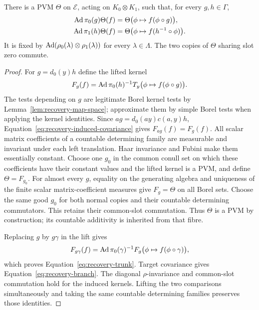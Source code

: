 \begin{lemma}[Uninduction]
\label{lem:recovery-uninduction}
There is a PVM \(\Theta\) on \(\mathscr E\), acting on
\(K_0\otimes K_1\), such that, for every \(g,h\in\Gamma\),
\begin{align}
 \operatorname{Ad}\pi_0(g)\Theta(f)
   &=\Theta\bigl(\phi\mapsto f(\phi\circ g)\bigr),\label{eq:recovery-trunk}\\
 \operatorname{Ad}\pi_1(h)\Theta(f)
   &=\Theta\bigl(\phi\mapsto f(h^{-1}\circ\phi)\bigr).
   \label{eq:recovery-branch}
\end{align}
It is fixed by \(\operatorname{Ad}(\rho_0(\lambda)\otimes\rho_1(\lambda))\)
for every \(\lambda\in\Lambda\).
The two copies of \(\Theta\) sharing slot zero commute.
\end{lemma}

\begin{proof}
For \(g=d_0(y)h\) define the lifted kernel
\[
 F_g(f)=\operatorname{Ad}\pi_0(h)^{-1}
     T_y\bigl(\phi\mapsto f(\phi\circ g)\bigr).
\]
The tests depending on \(g\) are legitimate Borel kernel tests by
Lemma~\ref{lem:recovery-map-space}; approximate them by simple Borel tests
when applying the kernel identities.  Since
\(ag=d_0(ay)c(a,y)h\), Equation~\eqref{eq:recovery-induced-covariance}
gives \(F_{ag}(f)=F_g(f)\).  All scalar matrix coefficients of a countable determining family are
measurable and invariant under each left translation. Haar invariance
and Fubini make them essentially constant. Choose one $g_0$ in the
common conull set on which these coefficients have their constant
values and the lifted kernel is a PVM, and define $\Theta=F_{g_0}$.
For almost every $g$, equality on the generating algebra and uniqueness
of the finite scalar matrix-coefficient measures give $F_g=\Theta$
on all Borel sets. Choose the same good $g_0$ for both normal copies
and their countable determining commutators. This retains their
common-slot commutation. Thus $\Theta$ is a PVM by construction;
its countable additivity is inherited from that fibre.

Replacing \(g\) by \(g\gamma\) in the lift gives
\[
 F_{g\gamma}(f)=\operatorname{Ad}\pi_0(\gamma)^{-1}
   F_g\bigl(\phi\mapsto f(\phi\circ\gamma)\bigr),
\]
which proves Equation~\eqref{eq:recovery-trunk}.
Target covariance gives Equation~\eqref{eq:recovery-branch}.
The diagonal \(\rho\)-invariance and common-slot commutation hold for the
induced kernels.  Lifting the two comparisons simultaneously and taking
the same countable determining families preserves those identities.
\end{proof}

